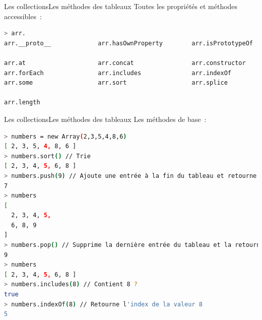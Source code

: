 \documentclass{beamer}
\begin{document}
    \begin{frame}[fragile]{Les collections}{Les méthodes des tableaux}
        Toutes les propriétés et méthodes accessibles~:
        \begin{lstlisting}[language=Bash,title={\tiny{Node.js}},basicstyle=\tiny\ttfamily]
> arr.
arr.__proto__             arr.hasOwnProperty        arr.isPrototypeOf         arr.propertyIsEnumerable  arr.valueOf

arr.at                    arr.concat                arr.constructor           arr.copyWithin            arr.entries               arr.every                 arr.fill                  arr.filter                arr.find                  arr.findIndex             arr.findLast              arr.findLastIndex         arr.flat                  arr.flatMap
arr.forEach               arr.includes              arr.indexOf               arr.join                  arr.keys                  arr.lastIndexOf           arr.map                   arr.pop                   arr.push                  arr.reduce                arr.reduceRight           arr.reverse               arr.shift                 arr.slice
arr.some                  arr.sort                  arr.splice                arr.toLocaleString        arr.toReversed            arr.toSorted              arr.toSpliced             arr.toString              arr.unshift               arr.values                arr.with

arr.length
        \end{lstlisting}
    \end{frame}

    \begin{frame}[fragile]{Les collections}{Les méthodes des tableaux}
        Les méthodes de base~:
        \begin{lstlisting}[language=Bash,title={\tiny{Node.js}}]
> numbers = new Array(2,3,5,4,8,6)
[ 2, 3, 5, 4, 8, 6 ]
> numbers.sort() // Trie
[ 2, 3, 4, 5, 6, 8 ]
> numbers.push(9) // Ajoute une entrée à la fin du tableau et retourne la taille
7
> numbers
[
  2, 3, 4, 5,
  6, 8, 9
]
> numbers.pop() // Supprime la dernière entrée du tableau et la retourne
9
> numbers
[ 2, 3, 4, 5, 6, 8 ]
> numbers.includes(8) // Contient 8 ?
true
> numbers.indexOf(8) // Retourne l'index de la valeur 8
5
        \end{lstlisting}
    \end{frame}
\end{document}
